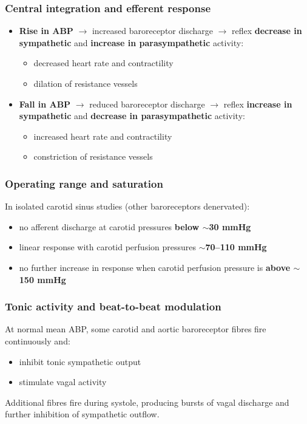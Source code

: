 \documentclass[11pt,a4paper]{article}
\begin{document}
\subsubsection{Central integration and efferent response}
\begin{itemize}
\item \textbf{Rise in ABP} $\rightarrow$ increased baroreceptor discharge $\rightarrow$ reflex \textbf{decrease in sympathetic} and \textbf{increase in parasympathetic} activity:
  \begin{itemize}
  \item decreased heart rate and contractility
  \item dilation of resistance vessels
  \end{itemize}
\item \textbf{Fall in ABP} $\rightarrow$ reduced baroreceptor discharge $\rightarrow$ reflex \textbf{increase in sympathetic} and \textbf{decrease in parasympathetic} activity:
  \begin{itemize}
  \item increased heart rate and contractility
  \item constriction of resistance vessels
  \end{itemize}
\end{itemize}

\subsubsection{Operating range and saturation}
In isolated carotid sinus studies (other baroreceptors denervated):
\begin{itemize}
\item no afferent discharge at carotid pressures \textbf{below $\sim$30 mmHg}
\item linear response with carotid perfusion pressures \textbf{$\sim$70--110 mmHg}
\item no further increase in response when carotid perfusion pressure is \textbf{above $\sim$150 mmHg}
\end{itemize}

\subsubsection{Tonic activity and beat-to-beat modulation}
At normal mean ABP, some carotid and aortic baroreceptor fibres fire continuously and:
\begin{itemize}
\item inhibit tonic sympathetic output
\item stimulate vagal activity
\end{itemize}
Additional fibres fire during systole, producing bursts of vagal discharge and further inhibition of sympathetic outflow.
\end{document}
